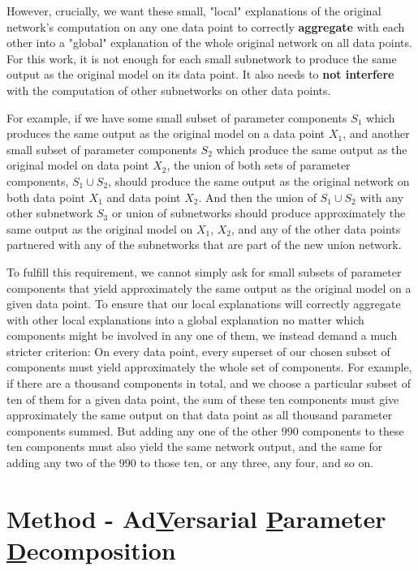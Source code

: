 \documentclass{article}
\begin{document}
However, crucially, we want these small, "local" explanations of the original network's computation on any one data point to correctly \textbf{aggregate} with each other into a "global" explanation of the whole original network on all data points. For this work, it is not enough for each small subnetwork to produce the same output as the original model on its data point. It also needs to \textbf{not interfere} with the computation of other subnetworks on other data points. 

For example, if we have some small subset of parameter components $S_1$ which produces the same output as the original model on a data point $X_1$, and another small subset of parameter components  $S_2$ which produce the same output as the original model on data point $X_2$, the union of both sets of parameter components, $S_1 \cup S_2$, should produce the same output as the original network on both data point $X_1$ and data point $X_2$. And then the union of $S_1 \cup S_2$ with any other subnetwork $S_3$ or union of subnetworks should produce approximately the same output as the original model on $X_1$, $X_2$, and any of the other data points partnered with any of the subnetworks that are part of the new union network.

To fulfill this requirement, we cannot simply ask for small subsets of parameter components that yield approximately the same output as the original model on a given data point. To ensure that our local explanations will correctly aggregate with other local explanations into a global explanation no matter which components might be involved in any one of them, we instead demand a much stricter criterion: On every data point, every superset of our chosen subset of components must yield approximately the whole set of components. For example, if there are a thousand components in total, and we choose a particular subset of ten of them for a given data point, the sum of these ten components must give approximately the same output on that data point as all thousand parameter components summed. But adding any one of the other $990$ components to these ten components must also yield the same network output, and the same for adding any two of the $990$ to those ten, or any three, any four, and so on.

\section{Method - Ad\underline{V}ersarial \underline{P}arameter \underline{D}ecomposition}
\label{sec:method}
\end{document}
